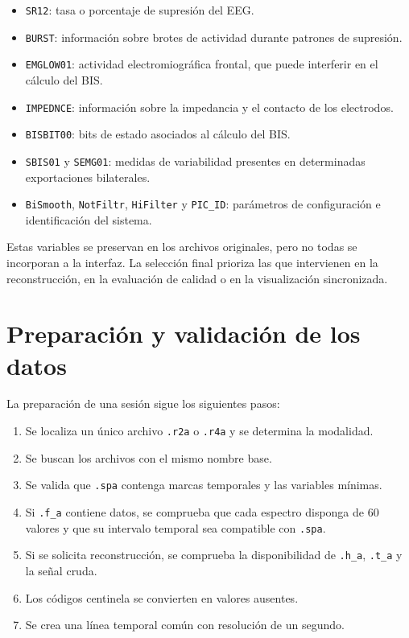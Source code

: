 \documentclass[
  spanish,
  a4paper,
  12pt,
  twoside]{memoir}
\providecommand{\tightlist}{%
  \setlength{\itemsep}{0pt}\setlength{\parskip}{0pt}}
\begin{document}
\begin{itemize}
\tightlist
\item
  \texttt{SR12}: tasa o porcentaje de supresión del EEG.
\item
  \texttt{BURST}: información sobre brotes de actividad durante patrones
  de supresión.
\item
  \texttt{EMGLOW01}: actividad electromiográfica frontal, que puede
  interferir en el cálculo del BIS.
\item
  \texttt{IMPEDNCE}: información sobre la impedancia y el contacto de
  los electrodos.
\item
  \texttt{BISBIT00}: bits de estado asociados al cálculo del BIS.
\item
  \texttt{SBIS01} y \texttt{SEMG01}: medidas de variabilidad presentes
  en determinadas exportaciones bilaterales.
\item
  \texttt{BiSmooth}, \texttt{NotFiltr}, \texttt{HiFilter} y
  \texttt{PIC\_ID}: parámetros de configuración e identificación del
  sistema.
\end{itemize}

Estas variables se preservan en los archivos originales, pero no todas
se incorporan a la interfaz. La selección final prioriza las que
intervienen en la reconstrucción, en la evaluación de calidad o en la
visualización sincronizada.

\chapter{Preparación y validación de los
datos}\label{preparaciuxf3n-y-validaciuxf3n-de-los-datos}

La preparación de una sesión sigue los siguientes pasos:

\begin{enumerate}
\def\labelenumi{\arabic{enumi}.}
\tightlist
\item
  Se localiza un único archivo \texttt{.r2a} o \texttt{.r4a} y se
  determina la modalidad.
\item
  Se buscan los archivos con el mismo nombre base.
\item
  Se valida que \texttt{.spa} contenga marcas temporales y las variables
  mínimas.
\item
  Si \texttt{.f\_a} contiene datos, se comprueba que cada espectro
  disponga de 60 valores y que su intervalo temporal sea compatible con
  \texttt{.spa}.
\item
  Si se solicita reconstrucción, se comprueba la disponibilidad de
  \texttt{.h\_a}, \texttt{.t\_a} y la señal cruda.
\item
  Los códigos centinela se convierten en valores ausentes.
\item
  Se crea una línea temporal común con resolución de un segundo.
\end{enumerate}
\end{document}
